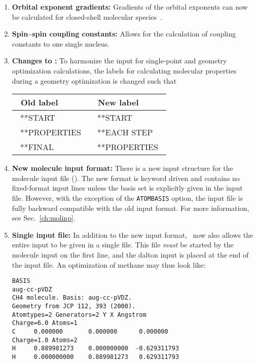 \begin{enumerate}
\item{\bf Orbital exponent gradients:} Gradients of the orbital
exponents can now be calculated for closed-shell molecular
species~\cite{fjthjcp121}.

\item{\bf Spin--spin coupling constants:} Allows for the calculation
  of coupling constants to one single nucleus.

\item{\bf Changes to \dalinp:} To harmonize the input for
  single-point and geometry optimization calculations, the labels for
  calculating  molecular properties during a geometry optimization is
  changed such that

\begin{center}
\begin{tabular}{|l|l|}\hline
\ Old label     & \ New label     \\\hline
\ **START       & \ **START       \\
\ **PROPERTIES\ & \ **EACH STEP   \\
\ **FINAL       & \ **PROPERTIES\ \\\hline
\end{tabular}
\end{center}

\item{\bf New molecule input format:} There is a new input structure
  for the molecule input file (\molinp). The new format is keyword driven and
  contains no fixed-format input lines unless the basis set is
  explicitly given in the input file. However, with the exception of
  the \verb|ATOMBASIS| option, the input file is fully backward
  compatible with the old input format. For more information, see
  Sec.~\ref{ch:molinp}.

\item{\bf Single input file:} In addition to the new input format,
  \dalton\ now also allows the entire input to be given in a
  single file. This file {\em must} be started by the molecule input on the
  first line, and the dalton input is placed at the end of the input
  file. An optimization of methane may thus look like:

\begin{verbatim}
BASIS
aug-cc-pVDZ
CH4 molecule. Basis: aug-cc-pVDZ.
Geometry from JCP 112, 393 (2000).
Atomtypes=2 Generators=2 Y X Angstrom
Charge=6.0 Atoms=1
C     0.000000       0.000000      0.000000
Charge=1.0 Atoms=2
H     0.889981273    0.000000000  -0.629311793
H     0.000000000    0.889981273   0.629311793


\end{verbatim}
\end{enumerate}
